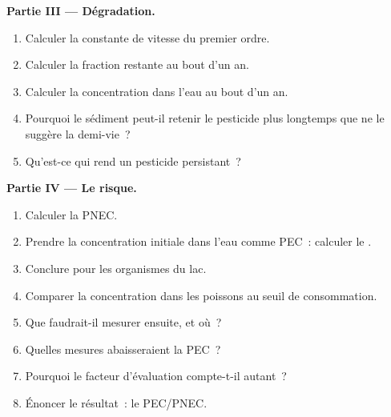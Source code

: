 \begin{problem}
\medskip\noindent\textbf{Partie III --- Dégradation.}
\begin{enumerate}[resume]
  \item Calculer la constante de vitesse du premier ordre.
  \item Calculer la fraction restante au bout d'un an.
  \item Calculer la concentration dans l'eau au bout d'un an.
  \item Pourquoi le sédiment peut-il retenir le pesticide plus longtemps
        que ne le suggère la demi-vie~?
  \item Qu'est-ce qui rend un pesticide persistant~?
\end{enumerate}

\medskip\noindent\textbf{Partie IV --- Le risque.}
\begin{enumerate}[resume]
  \item Calculer la PNEC.
  \item Prendre la concentration initiale dans l'eau comme PEC~: calculer le
        .
  \item Conclure pour les organismes du lac.
  \item Comparer la concentration dans les poissons au seuil de
        consommation.
  \item Que faudrait-il mesurer ensuite, et où~?
  \item Quelles mesures abaisseraient la PEC~?
  \item Pourquoi le facteur d'évaluation compte-t-il autant~?
  \item Énoncer le résultat~: le  PEC/PNEC.
\end{enumerate}
\end{problem}
